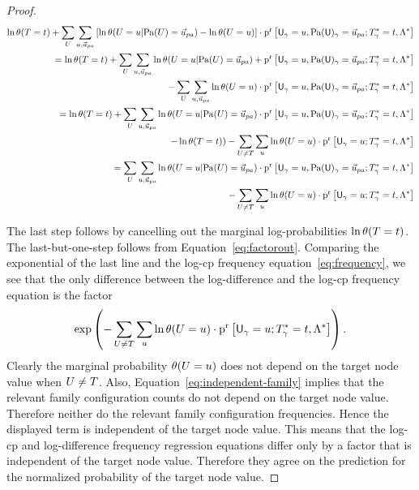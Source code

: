 \documentclass[twoside,11pt]{article}
\begin{document}
\begin{proof}
\begin{eqnarray*}
 \ln \jprob{\TT = \TV} + \sum_{\UT} \sum_{\UV,\Prange{\UT}}  
 \left[ \ln \cprob{\UT = \UV}{\Pa{\UT} = \Prange{\UT}} - \ln \jprob{\UT = \UV} \right] 
    \cdot 
\Relfreq{\Appendterm{\Ground{\UI}  = \UV} {\Ground{\Pa{\UI}} = \Prange{\UT}}} {\Qconj}  
 \\
 =  
 \ln \jprob{\TT = \TV}  + \sum_{\UT} \sum_{\UV,\Prange{\UT}} \ln \cprob{\UT = \UV}{\Pa{\UT} = \Prange{\UT}} +\Relfreq{\Appendterm{\Ground{\UI}  = \UV} {\Ground{\Pa{\UI}} = \Prange{\UT}}} {\Qconj} \\
 - \sum_{\UT} \sum_{\UV,\Prange{\UT}} \ln \jprob{\UT = \UV} \cdot \Relfreq{\Appendterm{\Ground{\UI}  = \UV} {\Ground{\Pa{\UI}} = \Prange{\UT}}} {\Qconj} \\
=  \ln \jprob{\TT = \TV}  + \sum_{\UT} \sum_{\UV,\Prange{\UT}} \ln \cprob{\UT = \UV}{\Pa{\UT} = \Prange{\UT}} \cdot  \Relfreq{\Appendterm{\Ground{\UI}  = \UV} {\Ground{\Pa{\UI}} = \Prange{\UT}}} {\Qconj}  \\
- \ln \jprob{\TT = \TV}) - \sum_{\UT \neq \TT} \sum_{\UV} \ln \jprob{\UT = \UV} \cdot \Relfreq{\Ground{\UI}  = \UV} {\Qconj} \\
=  \sum_{\UT} \sum_{\UV,\Prange{\UT}} \ln \cprob{\UT = \UV}{\Pa{\UT} = \Prange{\UT}} \cdot  \Relfreq{\Appendterm{\Ground{\UI}  = \UV} {\Ground{\Pa{\UI}} = \Prange{\UT}}} {\Qconj}  \\
 - \sum_{\UT \neq \TT} \sum_{\UV} \ln \jprob{\UT = \UV} \cdot \Relfreq{\Ground{\UI}  = \UV} {\Qconj} 
\end{eqnarray*}

The last step follows by cancelling out the marginal log-probabilities $\ln \theta(T = t)$. The last-but-one-step follows from Equation~\eqref{eq:factorout}. Comparing the exponential of the last line and the log-cp frequency equation~\eqref{eq:frequency}, we see that the only difference between the log-difference and the log-cp frequency equation is the factor $$ \exp \left( - \sum_{U \neq T} \sum_{u} \ln \theta(U = u) \cdot \mathrm{p}^{\mathrm{r}}\left[\mathsf{U}_\gamma  = u;T_{\gamma}^{*}\hspace{0.0ex} = t, \Lambda^{*}\hspace{0.0ex}\right] \right).$$ Clearly the marginal probability $\theta(U = u)$ does not depend on the target node value when $U \neq T$. Also, Equation~\eqref{eq:independent-family} implies that the relevant family configuration counts do not depend on the target node value. Therefore neither do the relevant family configuration frequencies. Hence the displayed term is independent of the target node value. This means that the log-cp and log-difference frequency regression equations differ only by a factor that is independent of the target node value. Therefore they agree on the prediction for the normalized probability of the target node value.


\end{proof}
\end{document}
